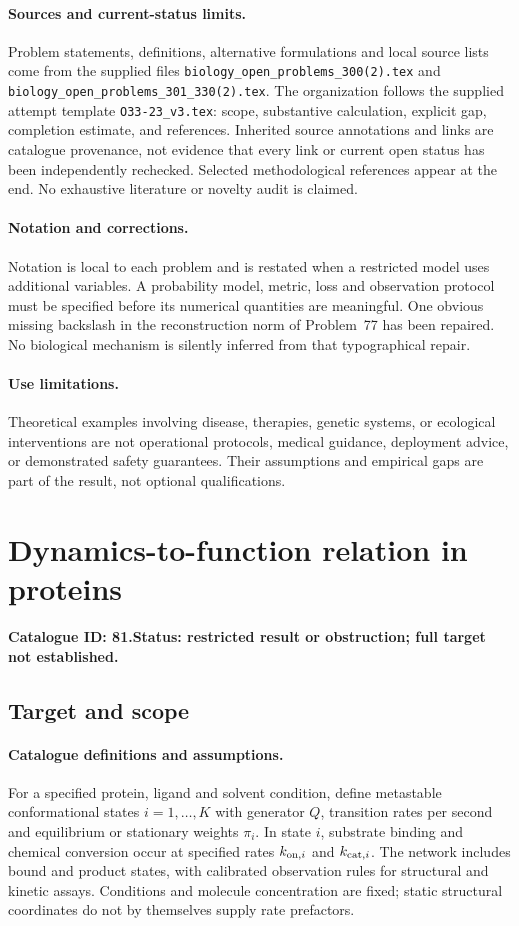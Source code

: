 \documentclass[11pt]{article}
\begin{document}
\paragraph{Sources and current-status limits.}
Problem statements, definitions, alternative formulations and local source lists
come from the supplied files
\texttt{biology\_open\_problems\_300(2).tex} and
\texttt{biology\_open\_problems\_301\_330(2).tex}.
The organization follows the supplied attempt template
\texttt{O33-23\_v3.tex}: scope, substantive calculation, explicit gap,
completion estimate, and references. Inherited source annotations and links are
catalogue provenance, not evidence that every link or current open status has
been independently rechecked. Selected methodological references appear at the
end. No exhaustive literature or novelty audit is claimed.

\paragraph{Notation and corrections.}
Notation is local to each problem and is restated when a restricted model uses
additional variables. A probability model, metric, loss and observation protocol
must be specified before its numerical quantities are meaningful. One obvious
missing backslash in the reconstruction norm of Problem~77 has been repaired.
No biological mechanism is silently inferred from that typographical repair.

\paragraph{Use limitations.}
Theoretical examples involving disease, therapies, genetic systems, or ecological
interventions are not operational protocols, medical guidance, deployment advice,
or demonstrated safety guarantees. Their assumptions and empirical gaps are part
of the result, not optional qualifications.

\setcounter{section}{80}
\section{Dynamics-to-function relation in proteins}
\label{prob:081}
\noindent\textbf{Catalogue ID: 81.}\quad \textbf{Status: restricted result or obstruction; full target not established.}
\subsection{Target and scope}
\paragraph{Catalogue definitions and assumptions.}
For a specified protein, ligand and solvent condition, define metastable conformational states $i=1,\ldots,K$ with generator $Q$, transition rates per second and equilibrium or stationary weights $\pi_i$. In state $i$, substrate binding and chemical conversion occur at specified rates $k_{{\rm on},i}$ and $k_{{\rm cat},i}$. The network includes bound and product states, with calibrated observation rules for structural and kinetic assays. Conditions and molecule concentration are fixed; static structural coordinates do not by themselves supply rate prefactors.
\end{document}
